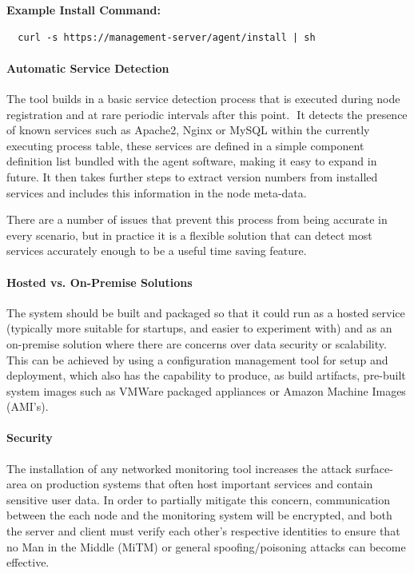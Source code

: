 \documentclass{cshonours}
\begin{document}
\textbf{Example Install Command:}
\begin{verbatim}
  curl -s https://management-server/agent/install | sh
\end{verbatim}

\paragraph{Automatic Service Detection} The tool builds in a basic service detection process that is executed during node registration and at rare periodic intervals after this point.
 It detects the presence of known services such as Apache2, Nginx or MySQL within the currently executing process table, these services are defined in a simple component definition list bundled with the agent software, making it easy to expand in future. It then takes further steps to extract version numbers from installed services and includes this information in the node meta-data.

There are a number of issues that prevent this process from being accurate in every scenario, but in practice it is a flexible solution that can detect most services accurately enough to be a useful time saving feature.

\paragraph{Hosted vs. On-Premise Solutions} The system should be built and packaged so that it could run as a hosted service (typically more suitable for startups, and easier to experiment with) and as an on-premise solution where there are concerns over data security or scalability. This can be achieved by using a configuration management tool for setup and deployment, which also has the capability to produce, as build artifacts, pre-built system images such as VMWare packaged appliances or Amazon Machine Images (AMI's).

\paragraph{Security} The installation of any networked monitoring tool increases the attack surface-area on production systems that often host important services and contain sensitive user data. In order to partially mitigate this concern, communication between the each node and the monitoring system will be encrypted, and both the server and client must verify each other’s respective identities to ensure that no Man in the Middle (MiTM) or general spoofing/poisoning attacks can become effective.
\end{document}
